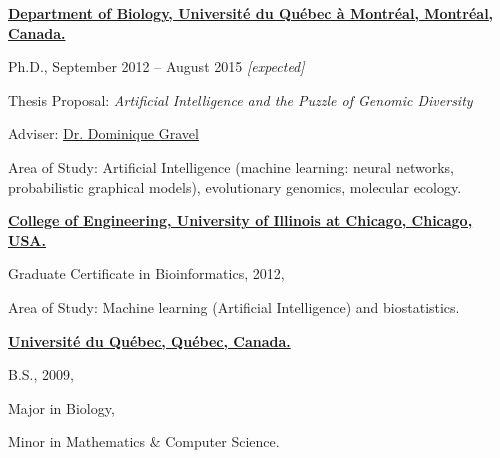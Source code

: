 \documentclass[10pt]{article}
\begin{document}
\href{http://www.bio.uqam.ca/}{\textbf{Department of Biology, Université du Québec à Montréal, Montréal, Canada.}}
\begin{outerlist}
\item[] Ph.D., September 2012 -- August 2015 \emph{[expected]}
        \begin{innerlist}
        \item Thesis Proposal: \emph{Artificial Intelligence and the Puzzle of Genomic Diversity}
        \item Adviser:
              \href{http://chaire-eec.uqar.ca/dom.php}
                   {Dr. Dominique Gravel}
        \item Area of Study: Artificial Intelligence (machine learning: neural networks, probabilistic graphical models), evolutionary genomics, molecular ecology.
        \end{innerlist}
\end{outerlist}

\hspace{.5cm}

\href{http://engineering.uic.edu/}{\textbf{College of Engineering, University of Illinois at Chicago, Chicago, USA.}}
\begin{outerlist}
\item[] Graduate Certificate in Bioinformatics, 2012,
        \begin{innerlist}
          \item Area of Study: Machine learning (Artificial Intelligence) and biostatistics.
        \end{innerlist}
\end{outerlist}

\hspace{.5cm}

\href{http://www.uquebec.ca/}{\textbf{Université du Québec, Québec, Canada.}}
\begin{outerlist}
\item[] B.S., 2009,
        \begin{innerlist}
          \item Major in Biology,
          \item Minor in Mathematics \& Computer Science.
        \end{innerlist}
\end{outerlist}
\end{document}
